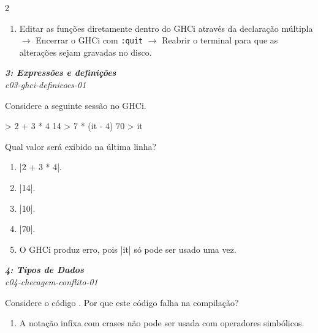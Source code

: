 \documentclass[a4paper,10pt,brazil]{article}
\begin{document}
\begin{multicols}{2}
\begin{enumerate}
  \item Editar as funções diretamente dentro do GHCi através da declaração múltipla $\rightarrow$ Encerrar o GHCi com \texttt{:quit} $\rightarrow$ Reabrir o terminal para que as alterações sejam gravadas no disco.


\end{enumerate}

\begin{flushright}
  \footnotesize
  \textit{\textbf{3: Expressões e definições}}\\
  \textit{c03-ghci-definicoes-01}\\

\end{flushright}
Considere a seguinte sessão no GHCi.

\begin{haskellcode}
> 2 + 3 * 4
14
> 7 * (it - 4)
70
> it
\end{haskellcode}

Qual valor será exibido na última linha?

\begin{enumerate}
  \item \haskellinline|2 + 3 * 4|.

  \item \haskellinline|14|.

  \item \haskellinline|10|.

  \item \haskellinline|70|.

  \item O GHCi produz erro, pois \haskellinline|it| só pode ser usado uma vez.


\end{enumerate}

\begin{flushright}
  \footnotesize
  \textit{\textbf{4: Tipos de Dados}}\\
  \textit{c04-checagem-conflito-01}\\

\end{flushright}
Considere o código . Por que este código falha na compilação?

\begin{enumerate}
  \item A notação infixa com crases não pode ser usada com operadores simbólicos.


\end{enumerate}
\end{multicols}
\end{document}
